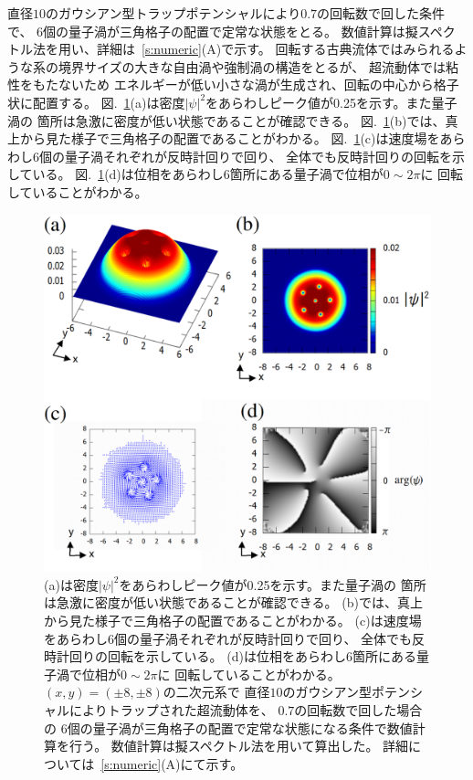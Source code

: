 \documentclass[12pt,a4paper]{jbook}
\begin{document}
        直径$10$のガウシアン型トラップポテンシャルにより$0.7$の回転数で回した条件で、
        $6$個の量子渦が三角格子の配置で定常な状態をとる。
        数値計算は擬スペクトル法を用い、詳細は~\ref{s:numeric}(A)で示す。
        回転する古典流体ではみられるような系の境界サイズの大きな自由渦や強制渦の構造をとるが、
        超流動体では粘性をもたないため
        エネルギーが低い小さな渦が生成され、回転の中心から格子状に配置する。
        図.~\ref{FIG:vortex}(a)は密度$|\psi|^2$をあらわしピーク値が0.25を示す。また量子渦の
        箇所は急激に密度が低い状態であることが確認できる。
        図.~\ref{FIG:vortex}(b)では、真上から見た様子で三角格子の配置であることがわかる。
        図.~\ref{FIG:vortex}(c)は速度場をあらわし$6$個の量子渦それぞれが反時計回りで回り、
        全体でも反時計回りの回転を示している。
        図.~\ref{FIG:vortex}(d)は位相をあらわし$6$箇所にある量子渦で位相が$0 \sim 2\pi$に
        回転していることがわかる。

		\begin{figure}[H]
			\centering
			\includegraphics[width=14cm]{vortex.eps}
			\caption{
                (a)は密度$|\psi|^2$をあらわしピーク値が0.25を示す。また量子渦の
                箇所は急激に密度が低い状態であることが確認できる。
                (b)では、真上から見た様子で三角格子の配置であることがわかる。
                (c)は速度場をあらわし$6$個の量子渦それぞれが反時計回りで回り、
                全体でも反時計回りの回転を示している。
                (d)は位相をあらわし$6$箇所にある量子渦で位相が$0 \sim 2\pi$に
                回転していることがわかる。
                $(x,y)=(\pm8,\pm8)$の二次元系で
                直径$10$のガウシアン型ポテンシャルによりトラップされた超流動体を、
                $0.7$の回転数で回した場合の
                $6$個の量子渦が三角格子の配置で定常な状態になる条件で数値計算を行う。
                数値計算は擬スペクトル法を用いて算出した。
                詳細については~\ref{s:numeric}(A)にて示す。
			}
			\label{FIG:vortex}
		\end{figure}
\end{document}
